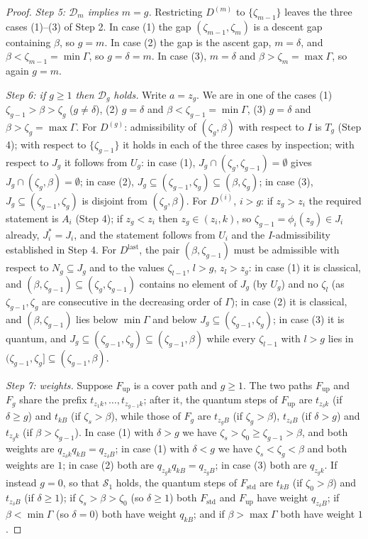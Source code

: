 \documentclass{amsart}
\theoremstyle{definition}
\theoremstyle{remark}
\numberwithin{equation}{section}
\begin{document}
\begin{proof}
\emph{Step 5: $\mathcal D_m$ implies $m=g$.} Restricting $D^{(m)}$ to $\{\zeta_{m-1}\}$ leaves the three cases (1)--(3) of Step 2. In case (1) the gap $(\zeta_{m-1},\zeta_m)$ is a descent gap containing $\beta$, so $g=m$. In case (2) the gap is the ascent gap, $m=\delta$, and $\beta<\zeta_{m-1}=\min\Gamma$, so $g=\delta=m$. In case (3), $m=\delta$ and $\beta>\zeta_m=\max\Gamma$, so again $g=m$.

\emph{Step 6: if $g\geq1$ then $\mathcal D_g$ holds.} Write $a=z_g$. We are in one of the cases (1) $\zeta_{g-1}>\beta>\zeta_g$ ($g\neq\delta$), (2) $g=\delta$ and $\beta<\zeta_{g-1}=\min\Gamma$, (3) $g=\delta$ and $\beta>\zeta_g=\max\Gamma$. For $D^{(g)}$: admissibility of $(\zeta_g,\beta)$ with respect to $I$ is $T_g$ (Step 4); with respect to $\{\zeta_{g-1}\}$ it holds in each of the three cases by inspection; with respect to $J_g$ it follows from $U_g$: in case (1), $J_g\cap(\zeta_g,\zeta_{g-1})=\emptyset$ gives $J_g\cap(\zeta_g,\beta)=\emptyset$; in case (2), $J_g\subseteq(\zeta_{g-1},\zeta_g)\subseteq(\beta,\zeta_g)$; in case (3), $J_g\subseteq(\zeta_{g-1},\zeta_g)$ is disjoint from $(\zeta_g,\beta)$. For $D^{(i)}$, $i>g$: if $z_g>z_i$ the required statement is $A_i$ (Step 4); if $z_g<z_i$ then $z_g\in(z_i,k)$, so $\zeta_{g-1}=\phi_i(z_g)\in J_i$ already, $J^\ast_i=J_i$, and the statement follows from $U_i$ and the $I$-admissibility established in Step 4. For $D^{\mathrm{last}}$, the pair $(\beta,\zeta_{g-1})$ must be admissible with respect to $N_g\subseteq J_g$ and to the values $\zeta_{l-1}$, $l>g$, $z_l>z_g$: in case (1) it is classical, and $(\beta,\zeta_{g-1})\subseteq(\zeta_g,\zeta_{g-1})$ contains no element of $J_g$ (by $U_g$) and no $\zeta_l$ (as $\zeta_{g-1},\zeta_g$ are consecutive in the decreasing order of $\Gamma$); in case (2) it is classical, and $(\beta,\zeta_{g-1})$ lies below $\min\Gamma$ and below $J_g\subseteq(\zeta_{g-1},\zeta_g)$; in case (3) it is quantum, and $J_g\subseteq(\zeta_{g-1},\zeta_g)\subseteq(\zeta_{g-1},\beta)$ while every $\zeta_{l-1}$ with $l>g$ lies in $(\zeta_{g-1},\zeta_g]\subseteq(\zeta_{g-1},\beta)$.

\emph{Step 7: weights.} Suppose $F_{\mathrm{up}}$ is a cover path and $g\geq1$. The two paths $F_{\mathrm{up}}$ and $F_g$ share the prefix $t_{z_1k},\ldots,t_{z_{g-1}k}$; after it, the quantum steps of $F_{\mathrm{up}}$ are $t_{z_\delta k}$ (if $\delta\geq g$) and $t_{kB}$ (if $\zeta_s>\beta$), while those of $F_g$ are $t_{z_gB}$ (if $\zeta_g>\beta$), $t_{z_\delta B}$ (if $\delta>g$) and $t_{z_gk}$ (if $\beta>\zeta_{g-1}$). In case (1) with $\delta>g$ we have $\zeta_s>\zeta_0\geq\zeta_{g-1}>\beta$, and both weights are $q_{z_\delta k}q_{kB}=q_{z_\delta B}$; in case (1) with $\delta<g$ we have $\zeta_s<\zeta_g<\beta$ and both weights are $1$; in case (2) both are $q_{z_gk}q_{kB}=q_{z_gB}$; in case (3) both are $q_{z_gk}$. If instead $g=0$, so that $\mathcal S_1$ holds, the quantum steps of $F_{\mathrm{std}}$ are $t_{kB}$ (if $\zeta_0>\beta$) and $t_{z_\delta B}$ (if $\delta\geq1$); if $\zeta_s>\beta>\zeta_0$ (so $\delta\geq1$) both $F_{\mathrm{std}}$ and $F_{\mathrm{up}}$ have weight $q_{z_\delta B}$; if $\beta<\min\Gamma$ (so $\delta=0$) both have weight $q_{kB}$; and if $\beta>\max\Gamma$ both have weight $1$.


\end{proof}
\end{document}

